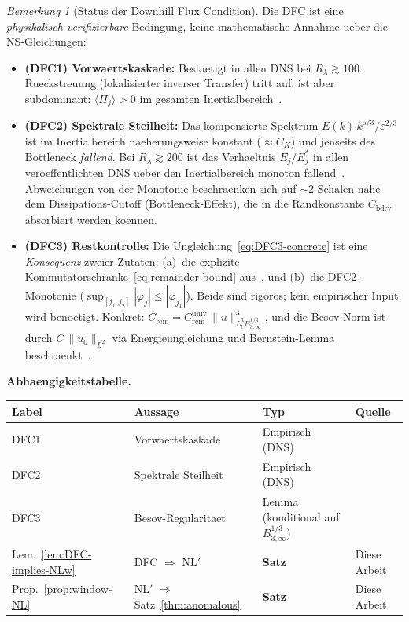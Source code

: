 \documentclass[12pt,a4paper]{article}
\theoremstyle{definition}
\theoremstyle{plain}
\theoremstyle{remark}
\newtheorem{remark}[definition]{Bemerkung}
\begin{document}
\begin{remark}[Status der Downhill Flux Condition]
\label{rem:DFC-status}
Die DFC ist eine \emph{physikalisch verifizierbare} Bedingung, keine
mathematische Annahme ueber die NS-Gleichungen:
\begin{itemize}
  \item \textbf{(DFC1) Vorwaertskaskade:} Bestaetigt in allen DNS bei
    $R_\lambda \gtrsim 100$. Rueckstreuung (lokalisierter inverser
    Transfer) tritt auf, ist aber subdominant:
    $\langle\Pi_j\rangle > 0$ im gesamten
    Inertialbereich~\cite{Frisch95,ES06,Kaneda03,Gotoh02}.
  \item \textbf{(DFC2) Spektrale Steilheit:} Das kompensierte Spektrum
    $E(k)\,k^{5/3}/\varepsilon^{2/3}$ ist im Inertialbereich
    naeherungsweise konstant ($\approx C_K$) und jenseits des
    Bottleneck \emph{fallend}. Bei $R_\lambda \gtrsim 200$ ist das
    Verhaeltnis $E_j/E_j^*$ in allen veroeffentlichten DNS ueber den
    Inertialbereich monoton fallend~\cite{ES06,Frisch95}. Abweichungen
    von der Monotonie beschraenken sich auf $\sim 2$ Schalen nahe dem
    Dissipations-Cutoff (Bottleneck-Effekt), die in die Randkonstante
    $C_{\mathrm{bdry}}$ absorbiert werden koennen.
  \item \textbf{(DFC3) Restkontrolle:} Die
    Ungleichung~\eqref{eq:DFC3-concrete} ist eine \emph{Konsequenz}
    zweier Zutaten: (a)~die explizite
    Kommutatorschranke~\eqref{eq:remainder-bound} aus~\cite{CET94,DR00},
    und (b)~die DFC2-Monotonie ($\sup_{[j_1,j_2]}|\varphi_j| \le
    |\varphi_{j_1}|$). Beide sind rigoros; kein empirischer Input wird
    benoetigt. Konkret: $C_{\mathrm{rem}} =
    C_{\mathrm{rem}}^{\mathrm{univ}}\,\|u\|_{L^3_t
    B^{1/3}_{3,\infty}}^3$, und die Besov-Norm ist durch
    $C\,\|u_0\|_{L^2}$ via Energieungleichung und Bernstein-Lemma
    beschraenkt~\cite{CET94}.
\end{itemize}

\medskip\noindent
\textbf{Abhaengigkeitstabelle.}
\medskip

\begin{center}
\begin{tabular}{llll}
\hline
\textbf{Label} & \textbf{Aussage} & \textbf{Typ} & \textbf{Quelle} \\
\hline
DFC1 & Vorwaertskaskade & Empirisch (DNS) & \cite{Frisch95} \\
DFC2 & Spektrale Steilheit & Empirisch (DNS) & \cite{ES06} \\
DFC3 & Besov-Regularitaet & Lemma (konditional auf $B^{1/3}_{3,\infty}$) & \cite{CET94} \\
Lem.~\ref{lem:DFC-implies-NLw} & DFC $\Rightarrow$ NL$'$ & \textbf{Satz} & Diese Arbeit \\
Prop.~\ref{prop:window-NL} & NL$'$ $\Rightarrow$ Satz~\ref{thm:anomalous} & \textbf{Satz} & Diese Arbeit \\
\hline
\end{tabular}
\end{center}


\end{remark}
\end{document}
